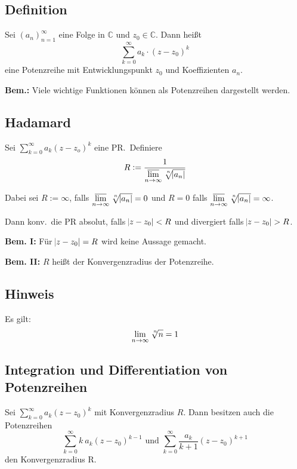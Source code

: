 \documentclass[10pt]{article}
\newcommand{\C}{\mathbb{C}}
\newcommand{\an}{{(a_n)}_{n=1}^\infty}
\newcommand*{\nthSqrt}[2]{\sqrt[\leftroot{-2}\uproot{2}#1]{#2}}
\begin{document}
    \subsection{Definition}
    Sei $\an$ eine Folge in $\C$ und $z_0 \in \C$. Dann heißt
    \begin{equation*}
        \sum_{k=0}^\infty a_k \cdot {(z - z_0)}^k
    \end{equation*}
    eine Potenzreihe mit Entwicklungspunkt $z_0$ und Koeffizienten
    $a_n$.

    \textbf{Bem.:} Viele wichtige Funktionen können als Potenzreihen dargestellt
    werden.

    \subsection{Hadamard}
    Sei $\sum_{k=0}^\infty a_k {(z-z_o)}^k$ eine PR.\ Definiere
    \begin{equation*}
        R := \frac{1}{\varlimsup\limits_{n \rightarrow \infty} \nthSqrt{n}{\abs{a_n}}}
    \end{equation*}

    Dabei sei $R:=\infty$, falls
    $\varlimsup\limits_{n \rightarrow \infty} \nthSqrt{n}{\abs{a_n}} = 0$ und
    $R=0$ falls
    $\varlimsup\limits_{n \rightarrow \infty} \nthSqrt{n}{\abs{a_n}} = \infty$.

    Dann konv.\ die PR absolut, falls $\abs{z - z_0} < R$ und divergiert falls
    $\abs{z - z_0} > R$.

    \textbf{Bem. I:} Für $\abs{z - z_0} = R$ wird keine Aussage gemacht.

    \textbf{Bem. II:} $R$ heißt der Konvergenzradius der Potenzreihe.

    \subsection{Hinweis}
    Es gilt:
    \begin{equation*}
        \lim_{n \rightarrow \infty} \nthSqrt{n}{n} = 1
    \end{equation*}

    \subsection{Integration und Differentiation von Potenzreihen}
    Sei $\sum_{k=0}^\infty a_k {(z - z_0)}^k$ mit Konvergenzradius $R$. Dann besitzen
    auch die Potenzreihen
    \begin{equation*}
        \sum_{k=0}^\infty k\: a_k {(z - z_0)}^{k-1} \text{ und }
        \sum_{k=0}^\infty \frac{a_k}{k+1} {(z-z_0)}^{k+1}
    \end{equation*}
    den Konvergenzradius R.
\end{document}
